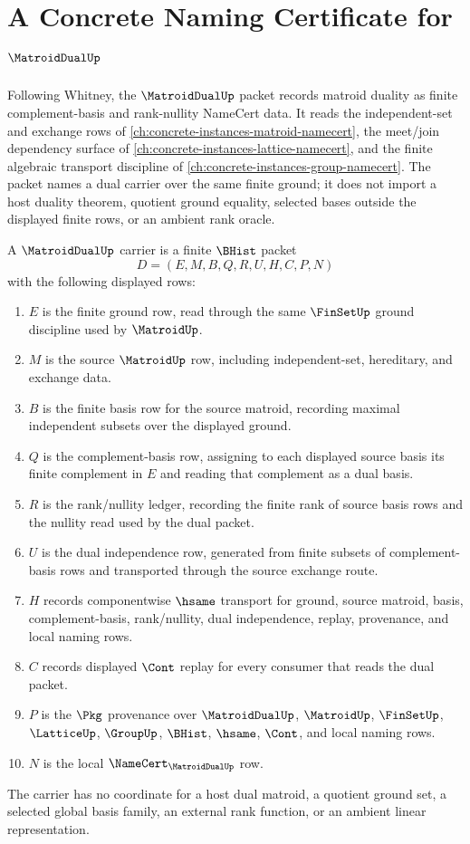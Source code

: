 \chapter{A Concrete Naming Certificate for $\MatroidDualUp$}
\label{ch:concrete-instances-matroid-dual-namecert}

Following Whitney, the $\MatroidDualUp$ packet records matroid duality as finite complement-basis and rank-nullity NameCert data. It reads the independent-set and exchange rows of \autoref{ch:concrete-instances-matroid-namecert}, the meet/join dependency surface of \autoref{ch:concrete-instances-lattice-namecert}, and the finite algebraic transport discipline of \autoref{ch:concrete-instances-group-namecert}. The packet names a dual carrier over the same finite ground; it does not import a host duality theorem, quotient ground equality, selected bases outside the displayed finite rows, or an ambient rank oracle.

\begin{definition}
\label{def:matroid-dual-carrier}
A $\MatroidDualUp$ carrier is a finite $\BHist$ packet
$$
D=(E,M,B,Q,R,U,H,C,P,N)
$$
with the following displayed rows:
\begin{enumerate}
\item $E$ is the finite ground row, read through the same $\FinSetUp$ ground discipline used by $\MatroidUp$.
\item $M$ is the source $\MatroidUp$ row, including independent-set, hereditary, and exchange data.
\item $B$ is the finite basis row for the source matroid, recording maximal independent subsets over the displayed ground.
\item $Q$ is the complement-basis row, assigning to each displayed source basis its finite complement in $E$ and reading that complement as a dual basis.
\item $R$ is the rank/nullity ledger, recording the finite rank of source basis rows and the nullity read used by the dual packet.
\item $U$ is the dual independence row, generated from finite subsets of complement-basis rows and transported through the source exchange route.
\item $H$ records componentwise $\hsame$ transport for ground, source matroid, basis, complement-basis, rank/nullity, dual independence, replay, provenance, and local naming rows.
\item $C$ records displayed $\Cont$ replay for every consumer that reads the dual packet.
\item $P$ is the $\Pkg$ provenance over $\MatroidDualUp$, $\MatroidUp$, $\FinSetUp$, $\LatticeUp$, $\GroupUp$, $\BHist$, $\hsame$, $\Cont$, and local naming rows.
\item $N$ is the local $\NameCert_{\MatroidDualUp}$ row.
\end{enumerate}
The carrier has no coordinate for a host dual matroid, a quotient ground set, a selected global basis family, an external rank function, or an ambient linear representation.
\end{definition}


